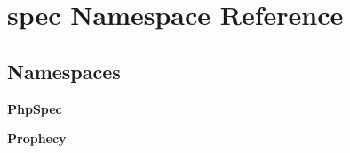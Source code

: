 \section{spec Namespace Reference}
\label{namespacespec}
\subsection*{Namespaces}
\begin{DoxyCompactItemize}
\item 
 {\bf Php\+Spec}
\item 
 {\bf Prophecy}
\end{DoxyCompactItemize}
